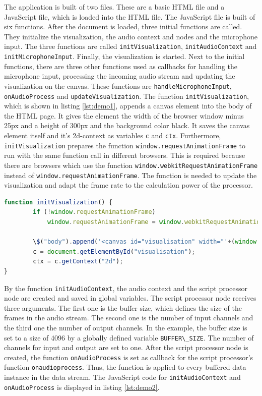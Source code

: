 \begin{sloppypar}
The application is built of two files. These are a basic HTML file and a JavaScript file, which is loaded into the HTML file. The JavaScript file is built of six functions. After the document is loaded, three initial functions are called. They initialize the visualization, the audio context and nodes and the microphone input. The three functions are called \lstinline{initVisualization}, \lstinline{initAudioContext} and \lstinline{initMicrophoneInput}. Finally, the visualization is started. Next to the initial functions, there are three other functions used as callbacks for handling the microphone input, processing the incoming audio stream and updating the visualization on the canvas. These functions are \lstinline{handleMicrophoneInput}, \lstinline{onAudioProcess} and \lstinline{updateVisualization}. The function \lstinline{initVisualization}, which is shown in listing \ref{lst:demo1}, appends a canvas element into the body of the HTML page. It gives the element the width of the browser window minus 25px and a height of 300px and the background color black. It saves the canvas element itself and it's 2d-context as variables \lstinline{c} and \lstinline{ctx}. Furthermore, \lstinline{initVisualization} prepares the function \lstinline{window.requestAnimationFrame} to run with the same function call in different browsers. This is required because there are browsers which use the function \lstinline{window.webkitRequestAnimationFrame} instead of \lstinline{window.requestAnimationFrame}. The function is needed to update the visualization and adapt the frame rate to the calculation power of the processor. 
\end{sloppypar}

\begin{lstlisting}[caption={Web Audio Demo: Initialize visualization.},label={lst:demo1}, language=JavaScript]
function initVisualization() {
		if (!window.requestAnimationFrame)
			window.requestAnimationFrame = window.webkitRequestAnimationFrame;

		\$("body").append('<canvas id="visualisation" width="'+(window.innerWidth-25)+'" height="300" style="background:black;"></canvas><br>');
		c = document.getElementById("visualisation");
		ctx = c.getContext("2d");
}
\end{lstlisting}

By the function \lstinline{initAudioContext}, the audio context and the script processor node are created and saved in global variables. The script processor node receives three arguments. The first one is the buffer size, which defines the size of the frames in the audio stream. The second one is the number of input channels and the third one the number of output channels. In the example, the buffer size is set to a size of 4096 by a globally defined variable \lstinline{BUFFER\_SIZE}. The number of channels for input and output are set to one. After the script processor node is created, the function \lstinline{onAudioProcess} is set as callback for the script processor's function \lstinline{onaudioprocess}. Thus, the function is applied to every buffered data instance in the data stream. The JavaScript code for \lstinline{initAudioContext} and \lstinline{onAudioProcess} is displayed in listing \ref{lst:demo2}.

